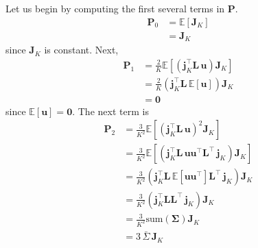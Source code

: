\documentclass[modern]{aastex62}
\begin{document}
Let us begin by computing the first several terms in $\mathbf{P}$.
%
\begin{align}
    \mathbf{P}_0 & = \mathbb{E}\left[ \mathbf{J}_K \right]
    \nonumber                                              \\
                 & = \mathbf{J}_K
\end{align}
%
since $\mathbf{J}_K$ is constant. Next,
%
\begin{align}
    \mathbf{P}_1 & = \frac{2}{K}\mathbb{E}\left[ \left(\mathbf{j}_K^\top \mathbf{L} \, \mathbf{u}\right) \mathbf{J}_K \right]
    \nonumber                                                                                                                 \\
                 & = \frac{2}{K}\left(\mathbf{j}_K^\top \mathbf{L} \, \mathbb{E}\left[ \mathbf{u} \right]\right) \mathbf{J}_K
    \nonumber                                                                                                                 \\
                 & = \mathbf{0}
\end{align}
%
since $\mathbb{E}\left[ \mathbf{u} \right] = \mathbf{0}$. The next term is
%
\begin{align}
    \mathbf{P}_2 & = \frac{3}{K^2}\mathbb{E}\left[ \left(\mathbf{j}_K^\top \mathbf{L} \, \mathbf{u}\right)^2 \mathbf{J}_K \right]
    \nonumber                                                                                                                                                                      \\
                 & = \frac{3}{K^2}\mathbb{E}\left[\left(\mathbf{j}_K^\top \mathbf{L} \,  \mathbf{u} \mathbf{u}^\top  \mathbf{L}^\top \, \mathbf{j}_K \right)  \mathbf{J}_K \right]
    \nonumber                                                                                                                                                                      \\
                 & = \frac{3}{K^2}\left(\mathbf{j}_K^\top \mathbf{L} \, \mathbb{E}\left[ \mathbf{u} \mathbf{u}^\top \right] \mathbf{L}^\top \, \mathbf{j}_K \right)  \mathbf{J}_K
    \nonumber                                                                                                                                                                      \\
                 & = \frac{3}{K^2}\left(\mathbf{j}_K^\top \mathbf{L} \mathbf{L}^\top \, \mathbf{j}_K \right)  \mathbf{J}_K
    \nonumber                                                                                                                                                                      \\
                 & = \frac{3}{K^2}\mathrm{sum}(\mathbf{\Sigma}) \mathbf{J}_K
    \nonumber                                                                                                                                                                      \\
                 & = 3 \, \bar{\Sigma} \, \mathbf{J}_K
\end{align}
\end{document}
